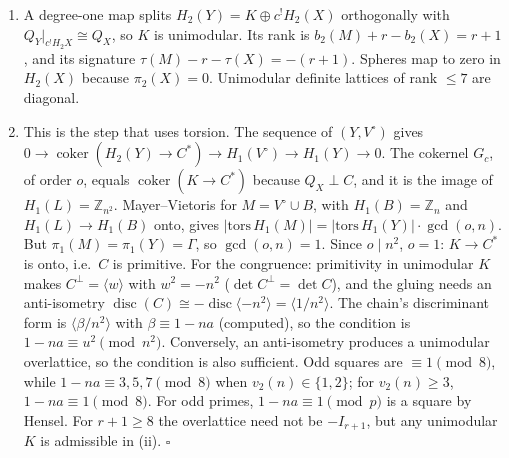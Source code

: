 \documentclass[
  10pt,
]{report}
\begin{document}
\begin{enumerate}
\def\labelenumi{(\roman{enumi})}
\setcounter{enumi}{1}
\item
  A degree-one map splits \(H_2(Y)=K\oplus c^!H_2(X)\) orthogonally with
  \(Q_Y|_{c^!H_2X}\cong Q_X\), so \(K\) is unimodular. Its rank is
  \(b_2(M)+r-b_2(X)=r+1\), and its signature
  \(\tau(M)-r-\tau(X)=-(r+1)\). Spheres map to zero in \(H_2(X)\)
  because \(\pi_2(X)=0\). Unimodular definite lattices of rank \(\le7\)
  are diagonal.
\item
  This is the step that uses torsion. The sequence of \((Y,V^\circ)\)
  gives
  \(0\to\operatorname{coker}(H_2(Y)\to C^*)\to H_1(V^\circ)\to H_1(Y)\to0\).
  The cokernel \(G_c\), of order \(o\), equals
  \(\operatorname{coker}(K\to C^*)\) because \(Q_X\perp C\), and it is
  the image of \(H_1(L)=\mathbb Z_{n^2}\). Mayer--Vietoris for
  \(M=V^\circ\cup B\), with \(H_1(B)=\mathbb Z_n\) and
  \(H_1(L)\to H_1(B)\) onto, gives
  \(|\mathrm{tors}\,H_1(M)|=|\mathrm{tors}\,H_1(Y)|\cdot\gcd(o,n)\). But
  \(\pi_1(M)=\pi_1(Y)=\Gamma\), so \(\gcd(o,n)=1\). Since \(o\mid n^2\),
  \(o=1\): \(K\to C^*\) is onto, i.e.~\(C\) is primitive. For the
  congruence: primitivity in unimodular \(K\) makes
  \(C^\perp=\langle w\rangle\) with \(w^2=-n^2\)
  (\(\det C^\perp=\det C\)), and the gluing needs an anti-isometry
  \(\operatorname{disc}(C)\cong-\operatorname{disc}\langle-n^2\rangle=\langle1/n^2\rangle\).
  The chain's discriminant form is \(\langle\beta/n^2\rangle\) with
  \(\beta\equiv1-na\) (computed), so the condition is
  \(1-na\equiv u^2\pmod{n^2}\). Conversely, an anti-isometry produces a
  unimodular overlattice, so the condition is also sufficient. Odd
  squares are \(\equiv1\pmod8\), while \(1-na\equiv3,5,7\pmod8\) when
  \(v_2(n)\in\{1,2\}\); for \(v_2(n)\ge3\), \(1-na\equiv1\pmod8\). For
  odd primes, \(1-na\equiv1\pmod p\) is a square by Hensel. For
  \(r+1\ge8\) the overlattice need not be \(-I_{r+1}\), but any
  unimodular \(K\) is admissible in (ii). \(\square\)
\end{enumerate}
\end{document}

